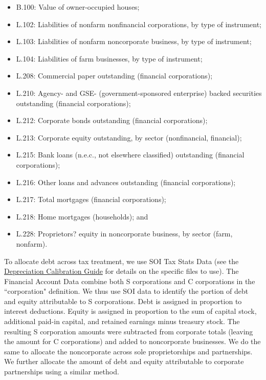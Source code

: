 \documentclass[article,11pt,letterpaper,fleqn]{article}
\theoremstyle{definition}
\numberwithin{equation}{section}
\begin{document}
\begin{itemize}
\item B.100: Value of owner-occupied houses;
\item L.102: Liabilities of nonfarm nonfinancial corporations, by type of instrument;
\item L.103: Liabilities of nonfarm noncorporate business, by type of instrument;
\item L.104: Liabilities of farm businesses, by type of instrument;
\item L.208: Commercial paper outstanding (financial corporations);
\item L.210: Agency- and GSE- (government-sponsored enterprise) backed securities outstanding (financial corporations);
\item L.212: Corporate bonds outstanding (financial corporations);
\item L.213: Corporate equity outstanding, by sector (nonfinancial, financial);
\item L.215: Bank loans (n.e.c., not elsewhere classified) outstanding (financial corporations);
\item L.216: Other loans and advances outstanding (financial corporations);
\item L.217: Total mortgages (financial corporations);
\item L.218: Home mortgages (households); and
\item L.228: Proprietors? equity in noncorporate business, by sector (farm, nonfarm).
\end{itemize}

To allocate debt across tax treatment, we use SOI Tax Stats Data (see the \href{https://github.com/OpenSourcePolicyCenter/dynamic/blob/master/Data/Calibration/DepreciationParameters/Depreciation_Calibration_Guide.pdf}{Depreciation Calibration Guide} for details on the specific files to use).  The Financial Account Data combine both S corporations and C corporations in the ``corporation" definition.  We thus use SOI data to identify the portion of debt and equity attributable to S corporations. Debt is assigned in proportion to interest deductions. Equity is assigned in proportion to the sum of capital stock, additional paid-in capital, and retained earnings minus treasury stock. The resulting S corporation amounts were subtracted from corporate totals (leaving the amount for C corporations) and added to noncorporate businesses.  We do the same to allocate the noncorporate across sole proprietorships and partnerships.  We further allocate the amount of debt and equity attributable to corporate partnerships using a similar method.
\end{document}
